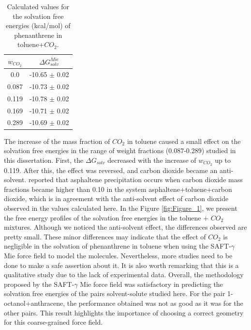 \FloatBarrier
\begin{table}[H]
	\centering
	\caption{Calculated values for the solvation free energies (kcal/mol) of phenanthrene in toluene+$CO_{2}$.}
	\label{tbl:solvco2}
	\begin{tabular}{cc}
		\hline
		\hline
		$w_{CO_{2}}$ & $\Delta G_{solv}^{Mie}$ \\
		\hline\hline
		0.0    & -10.65 $\pm$ 0.02   \\
		0.087  & -10.73 $\pm$ 0.02   \\
		0.119  & -10.78 $\pm$ 0.02   \\
		0.169  & -10.71 $\pm$ 0.02   \\
		0.289  & -10.69 $\pm$ 0.02   \\
		\hline
		\hline
	\end{tabular}
\end{table}
\FloatBarrier

The increase of the mass fraction of $CO_{2}$ in toluene caused a small effect on the solvation free energies in the range of weight fractions (0.087-0.289) studied in this dissertation. First, the $\Delta G_{solv}$ decreased with the increase of $w_{CO_{2}}$ up to 0.119. After this, the effect was reversed, and carbon dioxide became an anti-solvent.  reported that asphaltene precipitation occurs when carbon dioxide mass fractions became higher than 0.10 in the system asphaltene+toluene+carbon dioxide, which is in agreement with the anti-solvent effect of carbon dioxide observed in the values calculated here. In the Figure \ref{fig:Figure_1}, we present the free energy profiles of the solvation free energies in the toluene + $CO_{2}$ mixtures. Although we noticed the anti-solvent effect, the differences observed are pretty small. These minor differences may indicate that the effect of $CO_{2}$ is negligible in the solvation of phenanthrene in toluene when using the SAFT-$\gamma$ Mie force field to model the molecules. Nevertheless, more studies need to be done to make a safe assertion about it. It is also worth remarking that this is a qualitative study due to the lack of experimental data. Overall, the methodology proposed by the SAFT-$\gamma$ Mie force field was satisfactory in predicting the solvation free energies of the pairs solvent-solute studied here. For the pair 1-octanol+anthracene, the performance obtained was not as good as it was for the other pairs. This result highlights the importance of choosing a correct geometry for this coarse-grained force field.    

